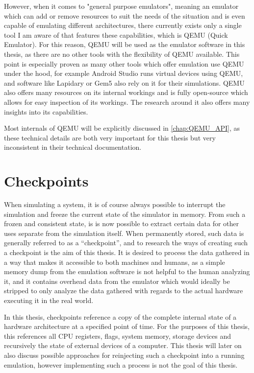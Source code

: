 However, when it comes to "general purpose emulators",
meaning an emulator which can add or remove resources to suit the needs of the situation
and is even capable of emulating different architectures,
there currently exists only a single tool I am aware of that features these capabilities,
which is QEMU (Quick Emulator).
For this reason, QEMU will be used as the emulator software in this thesis,
as there are no other tools with the flexibility of QEMU available.
This point is especially proven as many other tools which offer emulation
use QEMU under the hood, for example Android Studio runs virtual devices using QEMU,
and software like Lapidary\cite{lapidary} or Gem5\cite{gem5} also rely on it for their simulations.
QEMU also offers many resources on its internal workings and is fully open-source
which allows for easy inspection of its workings.
The research around it also offers many insights into its capabilities.

Most internals of QEMU will be explicitly discussed in \autoref{chap:QEMU_API},
as these technical details are both very important for this thesis
but very inconsistent in their technical documentation.

\section{Checkpoints}
When simulating a system, it is of course always possible to interrupt the simulation and freeze the current state of the simulator in memory.
From such a frozen and consistent state, is is now possible to extract certain data
for other uses separate from the simulation itself.
When permanently stored, such data is generally referred to as a \enquote{checkpoint},
and to research the ways of creating such a checkpoint is the aim of this thesis.
It is desired to process the data gathered in a way that makes it accessible to both machines and humans,
as a simple memory dump from the emulation software is not helpful to the human analyzing it,
and it contains overhead data from the emulator which would ideally be stripped
to only analyze the data gathered with regards to the actual hardware executing it in the real world.

In this thesis, checkpoints reference a copy of the complete internal state of a hardware architecture at a specified point of time.
For the purposes of this thesis, this references all CPU registers, flags, system memory,
storage devices and recursively the state of external devices of a computer.
This thesis will later on also discuss possible approaches for reinjecting such a checkpoint
into a running emulation, however implementing such a process is not the goal of this thesis.


